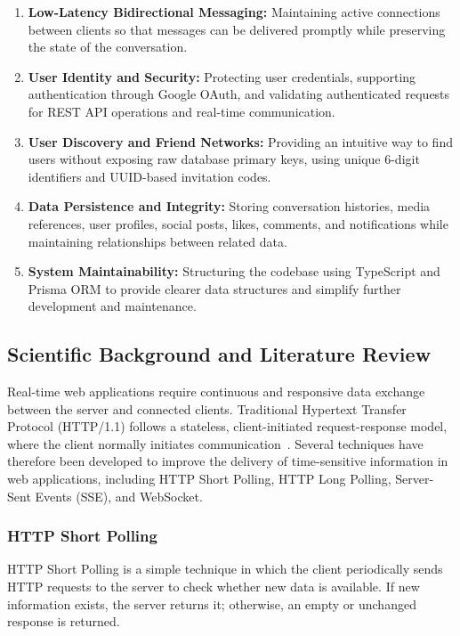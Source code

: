 \documentclass[12pt, a4paper]{article}
\begin{document}
\begin{enumerate}
    \item \textbf{Low-Latency Bidirectional Messaging:} Maintaining active connections between clients so that messages can be delivered promptly while preserving the state of the conversation.

    \item \textbf{User Identity and Security:} Protecting user credentials, supporting authentication through Google OAuth, and validating authenticated requests for REST API operations and real-time communication.

    \item \textbf{User Discovery and Friend Networks:} Providing an intuitive way to find users without exposing raw database primary keys, using unique 6-digit identifiers and UUID-based invitation codes.

    \item \textbf{Data Persistence and Integrity:} Storing conversation histories, media references, user profiles, social posts, likes, comments, and notifications while maintaining relationships between related data.

    \item \textbf{System Maintainability:} Structuring the codebase using TypeScript and Prisma ORM to provide clearer data structures and simplify further development and maintenance.
\end{enumerate}


\subsection{Scientific Background and Literature Review}

Real-time web applications require continuous and responsive data exchange between the server and connected clients. Traditional Hypertext Transfer Protocol (HTTP/1.1) follows a stateless, client-initiated request-response model, where the client normally initiates communication~\cite{rfc7230}. Several techniques have therefore been developed to improve the delivery of time-sensitive information in web applications, including HTTP Short Polling, HTTP Long Polling, Server-Sent Events (SSE), and WebSocket.

\subsubsection{HTTP Short Polling}

HTTP Short Polling is a simple technique in which the client periodically sends HTTP requests to the server to check whether new data is available. If new information exists, the server returns it; otherwise, an empty or unchanged response is returned.
\end{document}
